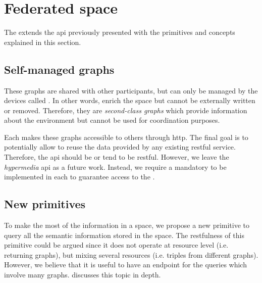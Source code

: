 \section{Federated space}
\label{sec:federated_space}

The \osapi{} extends the \ac{api} previously presented with the primitives and concepts explained in this section.


\subsection{Self-managed graphs}

These graphs are shared with other participants, but can only be managed by the devices called \asteroids{}. %
In other words, \selfgraphs{} enrich the space but cannot be externally written or removed. %
Therefore, they are \emph{second-class graphs} which provide information about the environment but cannot be used for coordination purposes.


Each \asteroid{} makes these graphs accessible to others through \ac{http}.
The final goal is to potentially allow to reuse the data provided by any existing \ac{rest}ful service. %
Therefore, the \ac{api} should be or tend to be \ac{rest}ful.
However, we leave the \emph{hypermedia} \ac{api} as a future work.
Instead, we require a mandatory \osapi{} to be implemented in each \asteroid{} to guarantee access to the \selfgraphs{}.


\subsection{New primitives}

To make the most of the information in a space, we propose a new primitive to query all the semantic information stored in the space.
The \ac{rest}fulness of this primitive could be argued since it does not operate at resource level (i.e. returning graphs), but mixing several resources (i.e. triples from different graphs).
However, we believe that it is useful to have an endpoint for the queries which involve many graphs.
\citet{kjernsmo_necessity_2012} discusses this topic in depth. %

